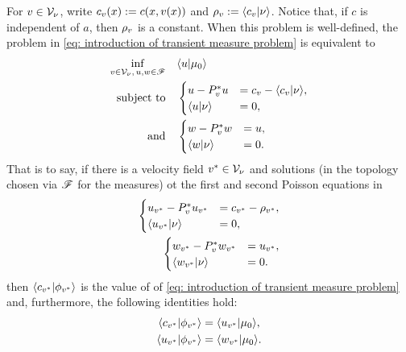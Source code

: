 \documentclass[twoside,10pt]{../jmlr}
\begin{document}
\begin{proposition}\label{prop: bias optimality and transient measure}
    For $v\in\mathcal{V}_\nu$, write $c_v(x):=c(x,v(x))$ and $\rho_v:=\langle c_v\vert\nu\rangle$. Notice that, if $c$ is independent of $a$, then $\rho_v$ is a constant.
    When this problem is well-defined, the problem in \eqref{eq: introduction of transient measure problem} is equivalent to 
    \begin{align}
        \inf_{v\in\mathcal{V}_\nu,\,u,w\in\mathscr{F}}\quad
        &\langle u\vert\mu_0\rangle\notag\\
        \text{subject to}\quad
        &\begin{cases}u-P_v^*u&=c_v-\langle c_v\vert\nu\rangle,\\
         \langle u\vert\nu\rangle&=0,\end{cases}\notag\\
        \text{and}\quad &\begin{cases}
        w-P_v^*w&=u,\\
        \langle w\vert\nu\rangle&=0.
        \end{cases}\label{eq: poisson representation of bias optimality}
    \end{align}
    That is to say, if there is a velocity field $v^*\in\mathcal{V}_\nu$ and solutions (in the topology chosen via $\mathscr{F}$ for the measures) ot the first and second Poisson equations in 
    \begin{align}
        \begin{cases} u_{v^*}-P_v^*u_{v^*}
        &=c_{v^*}-\rho_{v^*},\\
        \langle u_{v^*}\vert\nu\rangle&=0,\end{cases}\label{eq: first bias poisson equation}\\
        \begin{cases}w_{v^*}-P_v^*w_{v^*}
        &=u_{v^*},\\
        \langle w_{v^*}\vert\nu\rangle&=0.\end{cases}\label{eq: second bias poisson equation}
    \end{align}
    then $\langle c_{v^*}\vert\phi_{v^*}\rangle$ is the value of of \eqref{eq: introduction of transient measure problem} and, furthermore, the following identities hold:
    \begin{align}
        \langle c_{v^*}\vert\phi_{v^*}\rangle
        &=\langle u_{v^*}\vert\mu_0\rangle,\label{eq: first bias representation}\\
        \langle u_{v^*}\vert\phi_{v^*}\rangle
        &=\langle w_{v^*}\vert\mu_0\rangle.\label{eq: second bias representation}
    \end{align}
\end{proposition}
\end{document}
